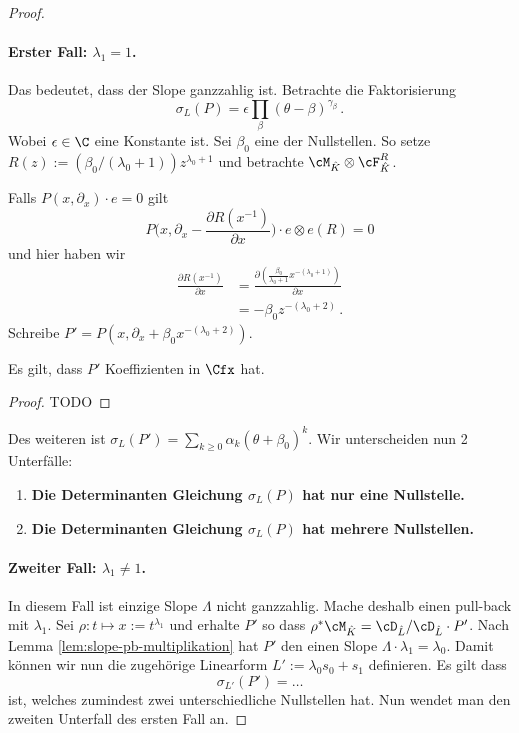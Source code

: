 \begin{proof}
\paragraph{Erster Fall: $\lambda_1=1$.} Das bedeutet, dass der Slope ganzzahlig
ist. Betrachte die Faktorisierung
\[
\sigma_L(P)=\epsilon\prod_{\beta}(\theta-\beta)^{\gamma_\beta}\,.
\]
Wobei $\epsilon\in\C$ eine Konstante ist.  Sei $\beta_0$  eine der Nullstellen.
So setze $R(z):=(\beta_0/(\lambda_0+1))z^{\lambda_0+1}$ und betrachte
$\cM_{\hat K}\otimes \cF_{\hat K}^R$.
\begin{comment}
AB HIER VLT NICHT RICHTIG, nur versuch
\end{comment}
Falls $P(x,\partial_x)\cdot e=0$ gilt
\[
P\Big(x,\partial_x-\frac{\partial R(x^{-1})}{\partial x}\Big)
  \cdot e\otimes e(R)=0
\]
und hier haben wir 
\begin{align*}
\frac{\partial R(x^{-1})}{\partial x} 
  &=\frac{\partial(\frac{\beta_0}{\lambda_0+1}x^{-(\lambda_0+1)})}{\partial
  x}\\
  &=-\beta_0z^{-(\lambda_0+2)} \,.
\end{align*}
Schreibe $P'=P(x,\partial_x+\beta_0x^{-(\lambda_0+2)})$.
\begin{lem}
Es gilt, dass $P'$ Koeffizienten in $\Cfx$ hat.
\end{lem}
\begin{proof}
TODO
\end{proof}
Des weiteren ist $\sigma_L(P')=\sum_{k\geq 0}\alpha_k(\theta+\beta_0)^k$. Wir
unterscheiden nun 2 Unterfälle:
\begin{enumerate}
\item \textbf{Die Determinanten Gleichung $\sigma_L(P)$ hat nur eine
Nullstelle.}
\begin{comment}TODO: Hier weiter \end{comment}
\item \textbf{Die Determinanten Gleichung $\sigma_L(P)$ hat mehrere
Nullstellen.}
\begin{comment}TODO: Hier weiter \end{comment}
\end{enumerate}

\paragraph{Zweiter Fall: $\lambda_1\neq1$.} In diesem Fall ist einzige Slope
$\Lambda$ nicht ganzzahlig. Mache deshalb einen pull-back mit $\lambda_1$. Sei
$\rho:t\mapsto x:=t^{\lambda_1}$ und erhalte $P'$ so dass $\rho^*\cM_{\hat
K}=\cD_{\hat L}/\cD_{\hat L}\cdot P'$.
Nach Lemma \ref{lem:slope-pb-multiplikation} hat $P'$ den einen Slope
$\Lambda\cdot\lambda_1=\lambda_0$.
Damit können wir nun die zugehörige Linearform $L':=\lambda_0s_0+s_1$
definieren. Es gilt dass
\[
\sigma_{L'}(P')=\dots
\]
ist, welches zumindest zwei unterschiedliche Nullstellen hat. Nun wendet man
den zweiten Unterfall des ersten Fall an.

\end{proof} %

